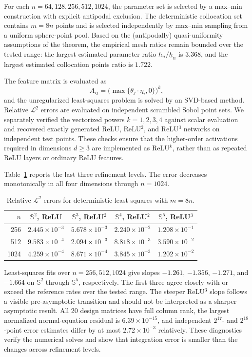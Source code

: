 \documentclass{article}
\numberwithin{equation}{section}
\begin{document}
For each \(n=64,128,256,512,1024\), the parameter set is selected by a max--min construction with explicit antipodal exclusion. The deterministic collocation set contains \(m=8n\) points and is selected independently by max--min sampling from a uniform sphere-point pool. Based on the (antipodally) quasi-uniformity assumptions of the theorem, the empirical mesh ratios remain bounded over the tested range: the largest estimated parameter ratio \( h_n/\underline h_n\) is \(3.368\), and the largest estimated collocation points ratio is \(1.722\).

The feature matrix is evaluated as
\[
 A_{ij}=\big(\max\{\theta_j\cdot\eta_i,0\}\big)^k,
\]
and the unregularized least-squares problem is solved by an SVD-based method. Relative \(\mathcal L^2\) errors are evaluated on independent scrambled Sobol point sets. We separately verified the vectorized powers \(k=1,2,3,4\) against scalar evaluation and recovered exactly generated ReLU, ReLU$^2$, and ReLU$^3$ networks on independent test points. These checks ensure that the higher-order activations required in dimensions \(d\ge3\) are implemented as ReLU$^k$, rather than as repeated ReLU layers or ordinary ReLU features.

Table~\ref{tab:least_squares_large_scale} reports the last three refinement levels. The error decreases monotonically in all four dimensions through \(n=1024\).

\begin{table}[H]
\centering
\small
\begin{tabular}{@{}rcccc@{}}
\toprule
\(n\) & \(\mathbb S^2\), ReLU & \(\mathbb S^3\), ReLU$^2$ &
\(\mathbb S^4\), ReLU$^2$ & \(\mathbb S^5\), ReLU$^3$\\
\midrule
256  & \(2.445\times10^{-3}\) & \(5.678\times10^{-3}\) & \(2.240\times10^{-2}\) & \(1.208\times10^{-1}\)\\
512  & \(9.583\times10^{-4}\) & \(2.094\times10^{-3}\) & \(8.818\times10^{-3}\) & \(3.590\times10^{-2}\)\\
1024 & \(4.259\times10^{-4}\) & \(8.671\times10^{-4}\) & \(3.845\times10^{-3}\) & \(1.202\times10^{-2}\)\\
\bottomrule
\end{tabular}
\caption{Relative \(\mathcal L^2\) errors for deterministic least squares with \(m=8n\).}
\label{tab:least_squares_large_scale}
\end{table}

Least-squares fits over \(n=256,512,1024\) give slopes \(-1.261\), \(-1.356\), \(-1.271\), and \(-1.664\) on \(\mathbb S^2\) through \(\mathbb S^5\), respectively. The first three agree closely with or exceed the reference rates over the tested range. The steeper ReLU$^3$ slope follows a visible pre-asymptotic transition and should not be interpreted as a sharper asymptotic result. All 20 design matrices have full column rank, the largest normalized normal-equation residual is \(6.39\times10^{-15}\), and independent \(2^{17}\)- and \(2^{18}\)-point error estimates differ by at most \(2.72\times10^{-3}\) relatively. These diagnostics verify the numerical solves and show that integration error is smaller than the changes across refinement levels.
\end{document}
